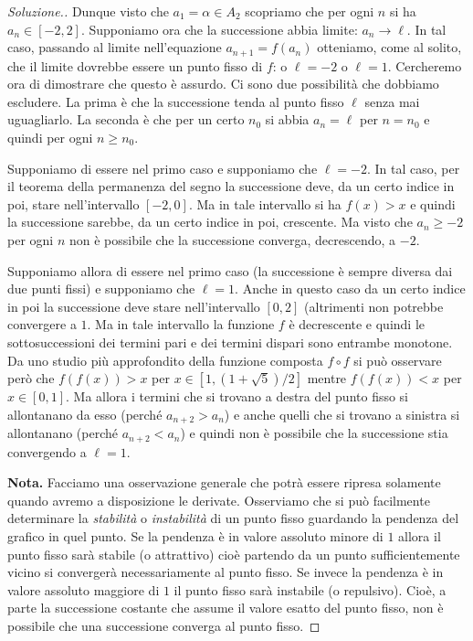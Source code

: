\documentclass[italian,a4paper]{scrartcl}
\begin{document}
\begin{proof}[Soluzione.]
  Dunque visto che $a_1 = \alpha \in A_2$ scopriamo che per ogni $n$
  si ha $a_n \in [-2,2]$. Supponiamo ora che la successione abbia
  limite: $a_n \to \ell$. In tal caso, passando al limite
  nell'equazione $a_{n+1} = f(a_n)$ otteniamo, come al solito, che il
  limite dovrebbe essere un punto fisso di $f$: o $\ell=-2$ o
  $\ell=1$. Cercheremo ora di dimostrare che questo è assurdo. Ci sono
  due possibilità che dobbiamo escludere. La prima è che la
  successione tenda al punto fisso $\ell$ senza mai uguagliarlo. La
  seconda è che per un certo $n_0$ si abbia $a_n = \ell$ per $n=n_0$ e
  quindi per ogni $n\ge n_0$.

  Supponiamo di essere nel primo caso e supponiamo che $\ell = -2$. In
  tal caso, per il teorema della permanenza del segno la successione
  deve, da un certo indice in poi, stare nell'intervallo $[-2, 0]$. Ma
  in tale intervallo si ha $f(x)>x$ e quindi la successione sarebbe,
  da un certo indice in poi, crescente. Ma visto che $a_n \ge -2$ per
  ogni $n$ non è possibile che la successione converga, decrescendo, a
  $-2$.

  Supponiamo allora di essere nel primo caso (la successione è sempre
  diversa dai due punti fissi) e supponiamo che $\ell = 1$. Anche in
  questo caso da un certo indice in poi la successione deve stare
  nell'intervallo $[0,2]$ (altrimenti non potrebbe convergere a
  $1$. Ma in tale intervallo la funzione $f$ è decrescente e quindi
  le sottosuccessioni dei termini pari e dei termini dispari sono
  entrambe monotone. Da uno studio più approfondito della funzione
  composta $f\circ f$ si può osservare però che $f(f(x)) > x$ per
  $x\in [1,(1+\sqrt 5)/2]$ mentre $f(f(x)) < x$ per $x \in [0,1]$. Ma
  allora i termini che si trovano a destra del punto fisso si
  allontanano da esso (perché $a_{n+2}> a_n$) e anche quelli che si
  trovano a sinistra si allontanano (perché $a_{n+2} < a_n$) e quindi
  non è possibile che la successione stia convergendo a $\ell = 1$.

  \textbf{Nota.} Facciamo una osservazione generale che potrà essere ripresa
  solamente quando avremo a disposizione le derivate. Osserviamo che
  si può facilmente determinare la \emph{stabilità} o
  \emph{instabilità} di un punto fisso guardando la pendenza del
  grafico in quel punto. Se la pendenza è in valore assoluto minore di
  $1$ allora il punto fisso sarà stabile (o attrattivo) cioè partendo
  da un punto sufficientemente vicino si convergerà necessariamente al
  punto fisso. Se invece la pendenza è in valore assoluto maggiore di
  $1$ il punto fisso sarà instabile (o repulsivo). Cioè, a parte la
  successione costante che assume il valore esatto del punto fisso,
  non è
  possibile che una successione converga al punto fisso.


\end{proof}
\end{document}
